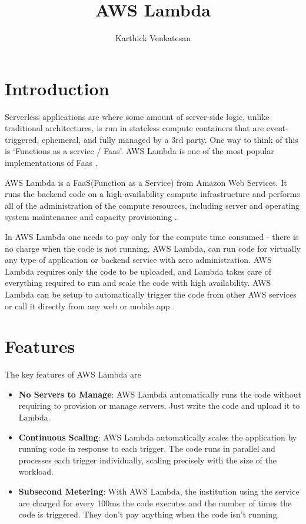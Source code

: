 \documentclass[9pt,twocolumn,twoside]{../../styles/osajnl}
\title{AWS Lambda}
\author[1,*,+]{Karthick Venkatesan}
\affil[1]{School of Informatics and Computing, Bloomington, IN 47408, U.S.A.}
\affil[*]{Corresponding authors: vkarthickprabu@gmail.com}
\affil[+]{HID - S17-IO-3023}
\begin{document}
\maketitle

\section{Introduction}

Serverless applications are where some amount of server-side logic, unlike traditional architectures, is run in 
stateless compute containers that are event-triggered, ephemeral, and fully 
managed by a 3rd party. One way to think of this is ‘Functions as a service / 
Faas'. AWS Lambda is one of the most popular implementations of Faas 
\cite{www-Serverless}.


AWS Lambda is a FaaS(Function as a Service)  from Amazon Web Services. It runs 
the backend code on a high-availability compute infrastructure and performs all 
of the administration of the compute resources, including server and operating 
system maintenance and capacity provisioning \cite{www-CouchAWSLambda}.
 
In AWS Lambda one needs to pay only for the compute time consumed - there is no 
charge when the code is not running. AWS Lambda, can run code for virtually any 
type of application or backend service with zero administration. AWS 
Lambda requires only the code to be uploaded, and Lambda takes care of 
everything required to run and scale the code with high availability. AWS 
Lambda can be setup to automatically trigger the code from other AWS services 
or call it directly from any web or mobile app \cite{www-AWSLambda}.



\section{Features}

The key features of AWS Lambda are \cite{www-AWSLambda}
\begin{itemize}
\renewcommand{\labelitemi}{\scriptsize$\bullet$} 
\item \textbf{No Servers to Manage}: AWS Lambda automatically runs the code 
without requiring to provision or manage servers. Just write the code and 
upload it to Lambda.

\item \textbf{Continuous Scaling}: AWS Lambda automatically scales the 
application by running code in response to each trigger. The code runs in 
parallel and processes each trigger individually, scaling precisely with the 
size of the workload.

\item \textbf{Subsecond Metering}: With AWS Lambda, the institution using the 
service are charged for every 100ms the code executes and the number of times 
the code is triggered. They don't pay anything when the code isn't running.

\end{itemize}
\end{document}
